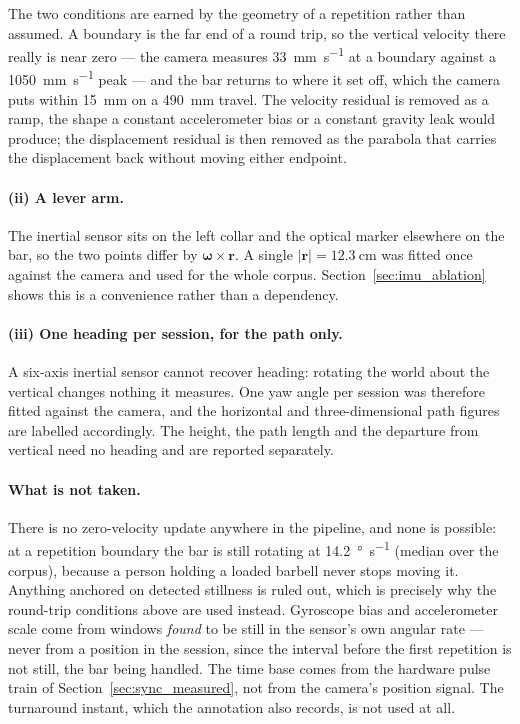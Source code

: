 The two conditions are earned by the geometry of a repetition rather than assumed. A
boundary is the far end of a round trip, so the vertical velocity there really is near
zero --- the camera measures \SI{33}{\milli\metre\per\second} at a boundary against a
\SI{1050}{\milli\metre\per\second} peak --- and the bar returns to where it set off, which
the camera puts within \SI{15}{\milli\metre} on a \SI{490}{\milli\metre} travel. The
velocity residual is removed as a ramp, the shape a constant accelerometer bias or a
constant gravity leak would produce; the displacement residual is then removed as the
parabola that carries the displacement back without moving either endpoint.

\paragraph{(ii) A lever arm.} The inertial sensor sits on the left collar and the optical
marker elsewhere on the bar, so the two points differ by $\bm{\omega} \times \bm{r}$. A
single $|\bm{r}| = \SI{12.3}{\centi\metre}$ was fitted once against the camera and used
for the whole corpus. Section~\ref{sec:imu_ablation} shows this is a convenience rather
than a dependency.

\paragraph{(iii) One heading per session, for the path only.} A six-axis inertial sensor
cannot recover heading: rotating the world about the vertical changes nothing it measures.
One yaw angle per session was therefore fitted against the camera, and the horizontal and
three-dimensional path figures are labelled accordingly. The height, the path length and
the departure from vertical need no heading and are reported separately.

\paragraph{What is not taken.} There is no zero-velocity update anywhere in the pipeline,
and none is possible: at a repetition boundary the bar is still rotating at
\SI{14.2}{\degree\per\second} (median over the corpus), because a person holding a loaded
barbell never stops moving it. Anything anchored on detected stillness is ruled out, which
is precisely why the round-trip conditions above are used instead. Gyroscope bias and
accelerometer scale come from windows \emph{found} to be still in the sensor's own angular
rate --- never from a position in the session, since the interval before the first
repetition is not still, the bar being handled. The time base comes from the hardware pulse
train of Section~\ref{sec:sync_measured}, not from the camera's position signal. The
turnaround instant, which the annotation also records, is not used at all.

